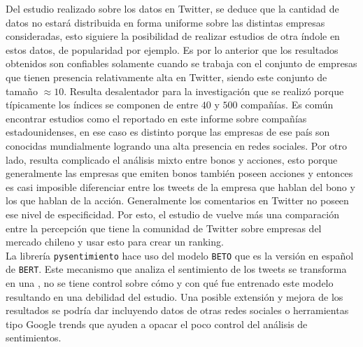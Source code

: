 \documentclass{article}
\begin{document}
Del estudio realizado sobre los datos en Twitter, se deduce que la cantidad de datos no estará distribuida en forma uniforme sobre las distintas empresas consideradas, esto siguiere la posibilidad de realizar estudios de otra índole en estos datos, de popularidad por ejemplo. Es por lo anterior que los resultados obtenidos son confiables solamente cuando se trabaja con el conjunto de empresas que tienen presencia relativamente alta en Twitter, siendo este conjunto de tamaño $\approx 10$. Resulta desalentador para la investigación que se realizó porque típicamente los índices se componen de entre $40$ y $500$ compañías. Es común encontrar estudios como el reportado en este informe sobre compañías estadounidenses, en ese caso es distinto porque las empresas de ese país son conocidas mundialmente logrando una alta presencia en redes sociales. Por otro lado, resulta complicado el análisis mixto entre bonos y acciones, esto porque generalmente las empresas que emiten bonos también poseen acciones y entonces es casi imposible diferenciar entre los tweets de la empresa que hablan del bono y los que hablan de la acción. Generalmente los comentarios en Twitter no poseen ese nivel de especificidad. Por esto, el estudio de vuelve más una comparación entre la percepción que tiene la comunidad de Twitter sobre empresas del mercado chileno y usar esto para crear un ranking.\\

La librería \texttt{pysentimiento} hace uso del modelo \texttt{BETO} que es la versión en español de \texttt{BERT}. Este mecanismo que analiza el sentimiento de los tweets se transforma en una , no se tiene control sobre cómo y con qué fue entrenado este modelo resultando en una debilidad del estudio. Una posible extensión y mejora de los resultados se podría dar incluyendo datos de otras redes sociales o herramientas tipo Google trends que ayuden a opacar el poco control del análisis de sentimientos.



\newpage
\end{document}
